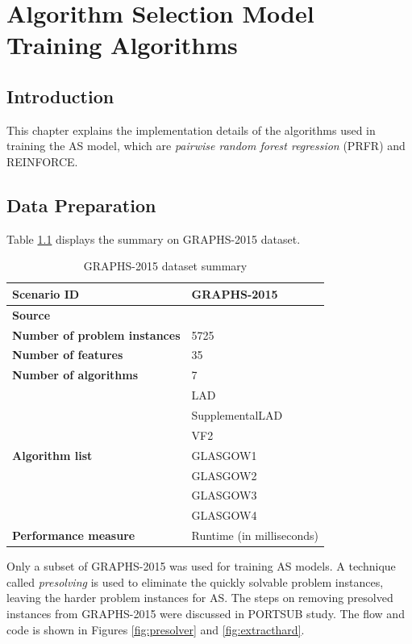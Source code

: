 \chapter{Algorithm Selection Model Training Algorithms}

\section{Introduction}
This chapter explains the implementation details of the algorithms used in training the AS model, which are \textit{pairwise random forest regression} (PRFR) and REINFORCE.

\section{Data Preparation}
\label{sec:dataprep}

Table \ref{tbl:graphs2015} displays the summary on GRAPHS-2015 dataset.

\begin{table}[H]
	\centering
	\begin{tabular}{|l|l|}
		\hline
		\textbf{Scenario ID} & GRAPHS-2015 \\ \hline
		\textbf{Source} & \citet{graphs2015} \\ \hline
		\textbf{Number of problem instances} & 5725 \\ \hline
		\textbf{Number of features} & 35 \\ \hline
		\textbf{Number of algorithms} & 7 \\ \hline
		\multirow{7}{*}{\textbf{Algorithm list}} & LAD \\ \cline{2-2} 
		& SupplementalLAD \\ \cline{2-2} 
		& VF2 \\ \cline{2-2} 
		& GLASGOW1 \\ \cline{2-2} 
		& GLASGOW2 \\ \cline{2-2} 
		& GLASGOW3 \\ \cline{2-2} 
		& GLASGOW4 \\ \hline
		\textbf{Performance measure} & Runtime (in milliseconds) \\ \hline
	\end{tabular}
	\caption{GRAPHS-2015 dataset summary}
	\label{tbl:graphs2015}
\end{table}

Only a subset of GRAPHS-2015 was used for training AS models. A technique called \textit{presolving} is used to eliminate the quickly solvable problem instances, leaving the harder problem instances for AS. The steps on removing presolved instances from GRAPHS-2015 were discussed in PORTSUB study. The flow and code is shown in Figures \ref{fig:presolver} and \ref{fig:extracthard}.


